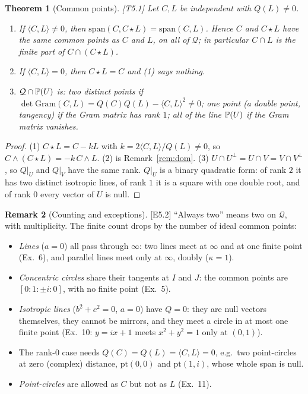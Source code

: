 \documentclass[11pt]{article}
\newtheorem{theorem}{Theorem}[section]\newtheorem{proposition}[theorem]{Proposition}
\theoremstyle{definition}\newtheorem{definition}[theorem]{Definition}\newtheorem{remark}[theorem]{Remark}\newtheorem{example}[theorem]{Example}
\newcommand{\ip}[2]{\langle #1,#2\rangle}\newcommand{\pt}{\mathrm{pt}}\newcommand{\Qd}{\mathcal{Q}}
\newcommand{\chk}[1]{\hfill{\footnotesize\textsf{[#1]}}}
\begin{document}
\begin{theorem}[Common points]\label{thm:common}\chk{T5.1}
Let $C,L$ be independent with $Q(L)\neq0$.
\begin{enumerate}
\item If $\ip CL\neq0$, then $\mathrm{span}(C,C\star L)=\mathrm{span}(C,L)$. Hence $C$ and $C\star L$ have the same common points as $C$ and $L$, on all of $\Qd$; in particular $C\cap L$ is the finite part of $C\cap(C\star L)$.
\item If $\ip CL=0$, then $C\star L=C$ and (1) says nothing.
\item $\Qd\cap\PP(U)$ is: two distinct points if $\det\mathrm{Gram}(C,L)=Q(C)Q(L)-\ip CL^2\neq0$; one point (a double point, tangency) if the Gram matrix has rank $1$; all of the line $\mathbb{P}(U)$ if the Gram matrix vanishes.
\end{enumerate}
\end{theorem}
\begin{proof}
(1) $C\star L=C-kL$ with $k=2\ip CL/Q(L)\neq0$, so $C\wedge(C\star L)=-k\,C\wedge L$. (2) is Remark~\ref{rem:dom}. (3) $U\cap U^\perp=U\cap V=V\cap V^\perp$, so $Q|_U$ and $Q|_V$ have the same rank. $Q|_U$ is a binary quadratic form: of rank $2$ it has two distinct isotropic lines, of rank $1$ it is a square with one double root, and of rank $0$ every vector of $U$ is null.
\end{proof}
\begin{remark}[Counting and exceptions]\label{rem:count}\chk{E5.2}
``Always two'' means two on $\Qd$, with multiplicity. The finite count drops by the number of ideal common points:
\begin{itemize}
\item \emph{Lines} ($a=0$) all pass through $\infty$: two lines meet at $\infty$ and at one finite point (Ex.~6), and parallel lines meet only at $\infty$, doubly ($\kappa=1$).
\item \emph{Concentric circles} share their tangents at $I$ and $J$: the common points are $[0:1:\pm i:0]$, with no finite point (Ex.~5).
\item \emph{Isotropic lines} ($b^2+c^2=0$, $a=0$) have $Q=0$: they are null vectors themselves, they cannot be mirrors, and they meet a circle in at most one finite point (Ex.~10: $y=ix+1$ meets $x^2+y^2=1$ only at $(0,1)$).
\item The rank-$0$ case needs $Q(C)=Q(L)=\ip CL=0$, e.g.\ two point-circles at zero (complex) distance, $\pt(0,0)$ and $\pt(1,i)$, whose whole span is null.
\item \emph{Point-circles} are allowed as $C$ but not as $L$ (Ex.~11).
\end{itemize}
\end{remark}
\end{document}
